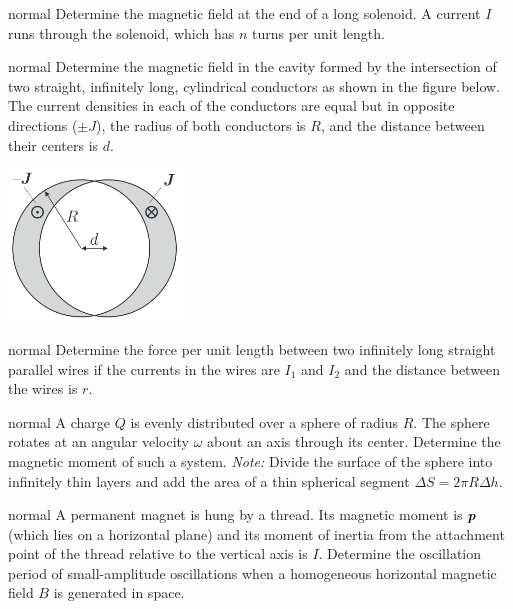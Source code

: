\hypertarget{P122}{}
\begin{solution}{normal} %
Determine the magnetic field at the end of a long solenoid. A current $I$ runs through the solenoid, which has $n$ turns per unit length.
\end{solution}

\hypertarget{P123}{}
\begin{solution}{normal} %
Determine the magnetic field in the cavity formed by the intersection of two straight, infinitely long, cylindrical conductors as shown in the figure below. The current densities in each of the conductors are equal but in opposite directions ($\pm J$), the radius of both conductors is $R$, and the distance between their centers is $d$.
\begin{center}
    \includegraphics[width=0.35\textwidth]{S4 Figures/S4-123.png}
\end{center}
\end{solution}

\hypertarget{P124}{}
\begin{solution}{normal} %
Determine the force per unit length between two infinitely long straight parallel wires if the currents in the wires are $I_1$ and $I_2$ and the distance between the wires is $r$.
\end{solution}

\hypertarget{P125}{}
\begin{solution}{normal} %
A charge $Q$ is evenly distributed over a sphere of radius $R$. The sphere rotates at an angular velocity $\omega$ about an axis through its center. Determine the magnetic moment of such a system. \textit{Note:} Divide the surface of the sphere into infinitely thin layers and add the area of a thin spherical segment $\Delta S=2\pi R\Delta h$.
\end{solution}

\hypertarget{P126}{}
\begin{solution}{normal} %
A permanent magnet is hung by a thread. Its magnetic moment is $\textbf{\textit{p}}$ (which lies on a horizontal plane) and its moment of inertia from the attachment point of the thread relative to the vertical axis is $I$. Determine the oscillation period of small-amplitude oscillations when a homogeneous horizontal magnetic field $B$ is generated in space.
\end{solution}


